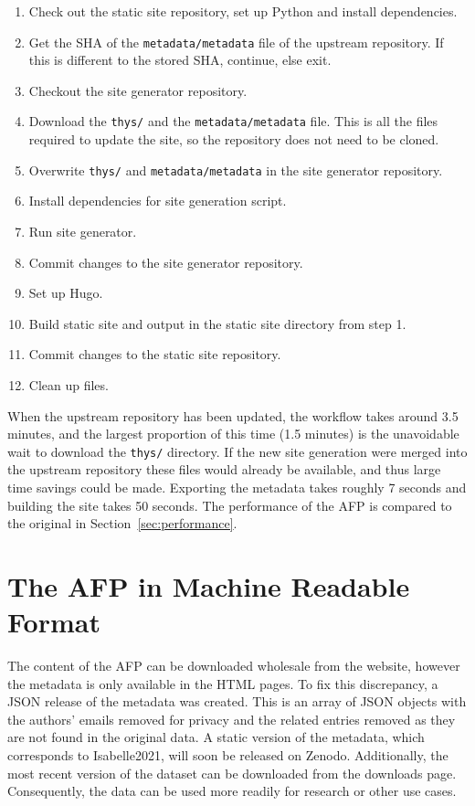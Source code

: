 \documentclass[bsc,frontabs,oneside,singlespacing,parskip,deptreport,logo]{infthesis}
\begin{document}
\begin{enumerate}
    \item Check out the static site repository, set up Python and install dependencies.
    \item Get the SHA of the \texttt{metadata/metadata} file of the upstream repository. If this is different to the stored SHA, continue, else exit.
    \item Checkout the site generator repository.
    \item Download the \texttt{thys/} and the \texttt{metadata/metadata} file. This is all the files required to update the site, so the repository does not need to be cloned.
    \item Overwrite \texttt{thys/} and \texttt{metadata/metadata} in the site generator repository.
    \item Install dependencies for site generation script.
    \item Run site generator.
    \item Commit changes to the site generator repository.
    \item Set up Hugo.
    \item Build static site and output in the static site directory from step 1.
    \item Commit changes to the static site repository.
    \item Clean up files.
\end{enumerate}

When the upstream repository has been updated, the workflow takes around 3.5 minutes, and the largest proportion of this time (1.5 minutes) is the unavoidable wait to download the \texttt{thys/} directory. If the new site generation were merged into the upstream repository these files would already be available, and thus large time savings could be made. Exporting the metadata takes roughly 7 seconds and building the site takes 50 seconds. The performance of the AFP is compared to the original in Section~\ref{sec:performance}. 

\section{The AFP in Machine Readable Format} \label{sec:machine-readable-format}

The content of the AFP can be downloaded wholesale from the website, however the metadata is only available in the HTML pages. To fix this discrepancy, a JSON release of the metadata was created. This is an array of JSON objects with the authors' emails removed  for privacy and the related entries removed as they are not found in the original data.  A static version of the metadata, which corresponds to Isabelle2021, will soon be released on Zenodo. Additionally, the most recent version of the dataset can be downloaded from the downloads page. Consequently, the data can be used more readily for research or other use cases.
\end{document}
